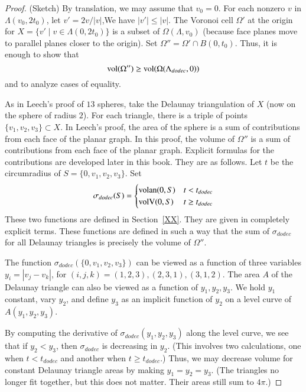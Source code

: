 \begin{proof} (Sketch) By translation, we may assume that $v_0=0$.
For each nonzero $v$ in $\Lambda(v_0,2t_0)$, 
let $v'=2v/|v|$,We have $|v'|\le|v|$.
The Voronoi cell $\Omega'$ at the origin for $X = \{v'\mid v\in\Lambda(0,2t_0)\}$ is a subset of $\Omega(\Lambda,v_0)$ (because face planes move to parallel planes closer to the origin).  
Set $\Omega'' = \Omega'\cap B(0,t_0)$.
Thus, it is enough to show
that 
   $${\operatorname{vol}}(\Omega'')\ge {\operatorname{vol}}(\Omega(\Lambda_{dodec},0))$$
and to analyze cases of equality.

As in Leech's proof of $13$ spheres, 
take the Delaunay triangulation of $X$ (now on the sphere of radius $2$).
For each triangle, there is a triple of points $\{v_1,v_2,v_3\}\subset X$.
In Leech's proof, the area of the sphere
is a sum
of contributions from each face of the planar graph.
In this proof, the volume of $\Omega''$ is a sum of contributions
from each face of the planar graph.  Explicit formulas for the
contributions are developed later in this book.  They are as follows.
Let $t$ be the circumradius of $S=\{0,v_1,v_2,v_3\}$.  Set
   $$\sigma_{dodec}(S) =
     \begin{cases}
       {\operatorname{volan}}(0,S) & t < t_{dodec}\\
       {\operatorname{volV}}(0,S) & t\ge t_{dodec}\\
     \end{cases}
     $$
These two functions are defined in Section~\ref{XX}. 
They are given in completely explicit terms.
These functions are defined in such a way that
the sum of $\sigma_{dodec}$ for all Delaunay triangles is precisely
the volume of $\Omega''$.

The function $\sigma_{dodec}(\{0,v_1,v_2,v_3\})$ can be viewed as a function of three
variables $y_i = |v_j-v_k|$, for $(i,j,k)=(1,2,3),(2,3,1),(3,1,2)$.
The area $A$ of the Delaunay triangle can also be viewed as a function of
$y_1,y_2,y_3$.
We hold $y_1$ constant, vary $y_2$, and define $y_3$ as an implicit
function of $y_2$ on a level curve of $A(y_1,y_2,y_3)$.

By computing the derivative of $\sigma_{dodec}(y_1,y_2,y_3)$ along
the level curve, we see that if $y_2 < y_3$, then $\sigma_{dodec}$
is decreasing in $y_2$.  (This involves two calculations, one
when $t<t_{dodec}$ and another when $t\ge t_{dodec}$.)  Thus, we 
may decrease volume for constant Delaunay triangle areas by making
$y_1=y_2=y_3$.
(The triangles no longer fit together, but this
does not matter.  Their areas still sum to $4\pi$.)


\end{proof}
